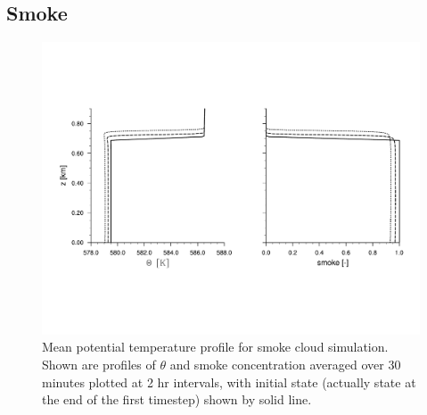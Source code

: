 \documentclass[11pt,a4paper]{article}
\begin{document}
\subsection{Smoke} 

\begin{figure}
\centering \leavevmode 
\includegraphics[width=12cm]{smoke}
\caption{Mean potential temperature profile for smoke cloud
simulation.  Shown are profiles of $\theta $ and smoke concentration
averaged over 30 minutes plotted at 2 hr intervals, with initial state
(actually state at the end of the first timestep) shown by solid
line.}
\label{fig:smoke}
\end{figure}
\end{document}
